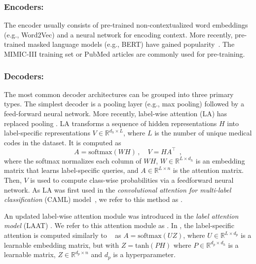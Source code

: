 {\subsubsection{Encoders:}
The encoder usually consists of pre-trained non-contextualized word embeddings (e.g., Word2Vec) and a neural network for encoding context. More recently, pre-trained masked language models (e.g., BERT) have gained popularity~\cite{tengReviewDeepNeural2022}. The MIMIC-III training set or PubMed articles are commonly used for pre-training.

\subsubsection{Decoders:}
The most common decoder architectures can be grouped into three primary types. 
The simplest decoder is a pooling layer (e.g., max pooling) followed by a feed-forward neural network. More recently, label-wise attention (LA) \cite{mullenbachExplainablePredictionMedical2018} has replaced pooling \cite{vuLabelAttentionModel2020, liuEffectiveConvolutionalAttention2021, huangPLMICDAutomaticICD2022, liICDCodingClinical2020}. LA transforms a sequence of hidden representations $H$ into label-specific representations $V \in \mathbb{R}^{d_h \times L}$, where $L$ is the number of unique medical codes in the dataset.
It is computed as
\begin{equation}
    A = \text{softmax}(WH) \, , \quad
    V = HA^{\top} \enspace ,
\end{equation}
where the softmax normalizes each column of $WH$, $W \in \mathbb{R}^{L \times d_h}$ is an embedding matrix that learns label-specific queries, and $A \in \mathbb{R}^{L \times n}$ is the attention matrix. 
Then, $V$ is used to compute class-wise probabilities via a feedforward neural network. 
As LA was first used in the \textit{convolutional attention for multi-label classification} (CAML) model~\cite{mullenbachExplainablePredictionMedical2018}, we refer to this method as \lacaml.

An updated label-wise attention module was introduced in the \textit{label attention model} (LAAT) \cite{vuLabelAttentionModel2020}. We refer to this attention module as \lalaat. In \lalaat, the label-specific attention is computed similarly to  \lacaml~ as $A = \text{softmax}(UZ)$, where $U \in \mathbb{R}^{L \times d_p}$ is a learnable embedding matrix, but with 
$Z = \text{tanh}(PH)$ 
where $P \in \mathbb{R}^{d_p \times d_h}$ is a learnable matrix, $Z \in \mathbb{R}^{d_p \times n}$ and $d_p$ is a hyperparameter.


}
